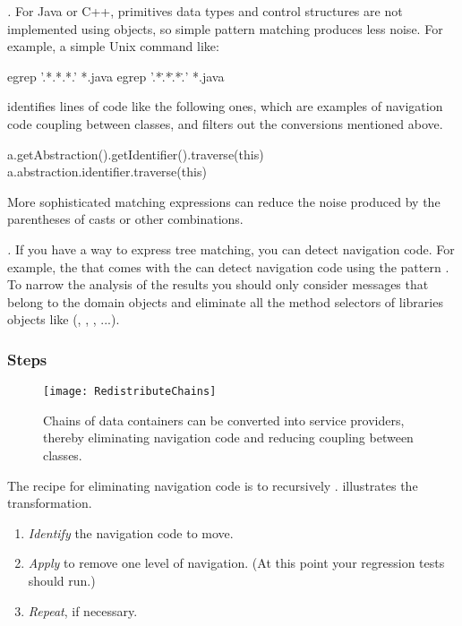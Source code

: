 \documentclass[a4paper,10pt,twoside]{book}
\begin{document}
\noindent
\emph{.}
For Java or C++, primitives data types and control structures are not implemented using objects, so simple pattern matching produces less noise. For example, a simple Unix command like: 

\begin{code}
egrep '.*\(\).*\(\).*\(\).' *.java
egrep '.*\..*\..*\..' *.java
\end{code}
\noindent
identifies lines of code like the following ones, which are examples of navigation code coupling between classes, and filters out the conversions mentioned above. 

\begin{code}
a.getAbstraction().getIdentifier().traverse(this) 
a.abstraction.identifier.traverse(this)
\end{code}

More sophisticated matching expressions can reduce the noise produced by the parentheses of casts or other combinations.

\noindent
\emph{.}
If you have a way to express tree matching, you can detect navigation code. For example, the  that comes with the  \cite{Robe97a} can detect navigation code using the pattern . To narrow the analysis of the results you should only consider messages that belong to the domain objects and eliminate all the method selectors of libraries objects like (, , , ...). 

\subsubsection*{Steps}

\begin{figure}
\begin{center}
\texttt{[image: RedistributeChains]}
\caption{Chains of data containers can be converted into service providers, thereby eliminating navigation code and reducing coupling between classes.}
\end{center}
\end{figure}

The recipe for eliminating navigation code is to recursively .  illustrates the transformation.
\begin{enumerate}
  \item \emph{Identify} the navigation code to move.
  \item \emph{Apply}  to remove one level of navigation. (At this point your regression tests should run.)
  \item \emph{Repeat}, if necessary.
\end{enumerate}
\end{document}

